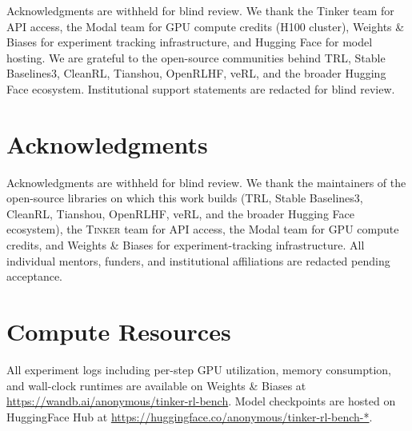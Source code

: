 \documentclass{article}
\newcommand{\tinker}{\textsc{Tinker}}
\begin{document}




\begin{ack}
Acknowledgments are withheld for blind review. We thank the Tinker team for
API access, the Modal team for GPU compute credits (H100 cluster), Weights
\& Biases for experiment tracking infrastructure, and Hugging Face for model
hosting. We are grateful to the open-source communities behind TRL, Stable
Baselines3, CleanRL, Tianshou, OpenRLHF, veRL, and the broader Hugging Face
ecosystem. Institutional support statements are redacted for blind review.
\end{ack}

\section*{Acknowledgments}
\label{sec:acknowledgments}
Acknowledgments are withheld for blind review. We thank the maintainers of the
open-source libraries on which this work builds (TRL, Stable Baselines3,
CleanRL, Tianshou, OpenRLHF, veRL, and the broader Hugging Face ecosystem),
the \tinker{} team for API access, the Modal team for GPU compute credits,
and Weights \& Biases for experiment-tracking infrastructure. All individual
mentors, funders, and institutional affiliations are redacted pending
acceptance.





\appendix

\section{Compute Resources}
\label{app:compute}

All experiment logs including per-step GPU utilization, memory consumption,
and wall-clock runtimes are available on Weights \& Biases at
\url{https://wandb.ai/anonymous/tinker-rl-bench}.
Model checkpoints are hosted on HuggingFace Hub at
\url{https://huggingface.co/anonymous/tinker-rl-bench-*}.
\end{document}
